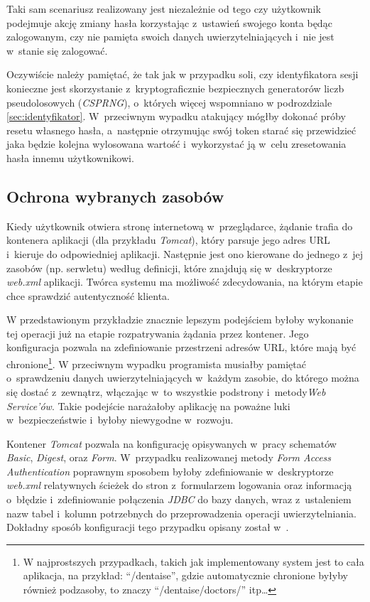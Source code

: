 \documentclass[11pt]{aghdpl}
\begin{document}
Taki sam scenariusz realizowany jest niezależnie od tego czy użytkownik podejmuje akcję zmiany hasła korzystając z~ustawień swojego konta będąc zalogowanym, czy nie pamięta swoich danych uwierzytelniających i~nie jest w~stanie się zalogować.

Oczywiście należy pamiętać, że tak jak w przypadku soli, czy identyfikatora sesji konieczne jest skorzystanie z~kryptograficznie bezpiecznych generatorów liczb pseudolosowych (\emph{CSPRNG}), o~których więcej wspomniano w podrozdziale \ref{sec:identyfikator}. W~przeciwnym wypadku atakujący mógłby dokonać próby resetu własnego hasła, a~następnie otrzymując swój token starać się przewidzieć jaka będzie kolejna wylosowana wartość i~wykorzystać ją w~celu zresetowania hasła innemu użytkownikowi.

\subsection{Ochrona wybranych zasobów}
\label{sec:ochronaWybranychZasobow}

Kiedy użytkownik otwiera stronę internetową w~przeglądarce, żądanie trafia do kontenera aplikacji (dla przykładu \emph{Tomcat}), który parsuje jego adres URL i~kieruje do odpowiedniej aplikacji. Następnie jest ono kierowane do jednego z~jej zasobów (np. serwletu) według definicji, które znajdują się w~deskryptorze \emph{web.xml} aplikacji. Twórca systemu ma możliwość zdecydowania, na którym etapie chce sprawdzić autentyczność klienta.

W przedstawionym przykładzie znacznie lepszym podejściem byłoby wykonanie tej operacji już na etapie rozpatrywania żądania przez kontener. Jego konfiguracja pozwala na zdefiniowanie przestrzeni adresów URL, które mają być chronione\footnote{W najprostszych przypadkach, takich jak implementowany system jest to cała aplikacja, na przykład: ``/dentaise'', gdzie automatycznie chronione byłyby również podzasoby, to znaczy ``/dentaise/doctors/'' itp\ldots}. W przeciwnym wypadku programista musiałby pamiętać o~sprawdzeniu danych uwierzytelniających w~każdym zasobie, do którego można się dostać z~zewnątrz, włączając w~to wszystkie podstrony i~metody\emph{Web Service'ów}. Takie podejście narażałoby aplikację na poważne luki w~bezpieczeństwie i~byłoby niewygodne w~rozwoju.

Kontener \emph{Tomcat} pozwala na konfigurację opisywanych w~pracy schematów \emph{Basic}, \emph{Digest}, oraz \emph{Form}. W~przypadku realizowanej metody \emph{Form Access Authentication} poprawnym sposobem byłoby zdefiniowanie w~deskryptorze \emph{web.xml} relatywnych ścieżek do stron z~formularzem logowania oraz informacją o~błędzie i~zdefiniowanie połączenia \emph{JDBC} do bazy danych, wraz z~ustaleniem nazw tabel i~kolumn potrzebnych do przeprowadzenia operacji uwierzytelniania. Dokładny sposób konfiguracji tego przypadku opisany został w~\cite{JRUA}.
\end{document}
